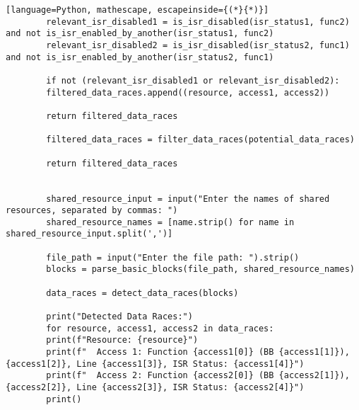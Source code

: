 \documentclass[
fancyheadings, %
%
%
]{stsreprt}
\begin{document}
\begin{lstlisting}[language=Python, mathescape, escapeinside={(*}{*)}]
		relevant_isr_disabled1 = is_isr_disabled(isr_status1, func2) and not is_isr_enabled_by_another(isr_status1, func2)
		relevant_isr_disabled2 = is_isr_disabled(isr_status2, func1) and not is_isr_enabled_by_another(isr_status2, func1)
		
		if not (relevant_isr_disabled1 or relevant_isr_disabled2):
		filtered_data_races.append((resource, access1, access2))
		
		return filtered_data_races
		
		filtered_data_races = filter_data_races(potential_data_races)
		
		return filtered_data_races
		
		
		shared_resource_input = input("Enter the names of shared resources, separated by commas: ")
		shared_resource_names = [name.strip() for name in shared_resource_input.split(',')]
		
		file_path = input("Enter the file path: ").strip()
		blocks = parse_basic_blocks(file_path, shared_resource_names)
		
		data_races = detect_data_races(blocks)
		
		print("Detected Data Races:")
		for resource, access1, access2 in data_races:
		print(f"Resource: {resource}")
		print(f"  Access 1: Function {access1[0]} (BB {access1[1]}), {access1[2]}, Line {access1[3]}, ISR Status: {access1[4]}")
		print(f"  Access 2: Function {access2[0]} (BB {access2[1]}), {access2[2]}, Line {access2[3]}, ISR Status: {access2[4]}")
		print()
	\end{lstlisting}
\end{document}
